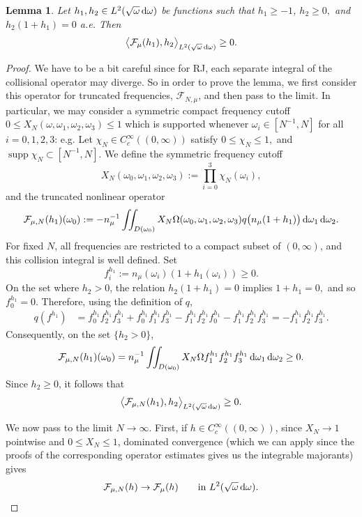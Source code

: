 \documentclass[reqno,11pt,letterpaper]{amsart}
\numberwithin{equation}{section}
\newcommand{\dd}{\, {\rm d}}
\newtheorem{lemma}[proposition]{Lemma}
\begin{document}
\begin{lemma}
\label{lemm:positiv_F_mu}
Let $h_1,h_2 \in L^2(\sqrt{\omega}\dd\omega)$ be functions such that
$
h_1\geq-1$, $ h_2\geq0,$ and $ h_2(1+h_1)=0$ a.e. Then
$$
\big\langle
\mathcal{F}_\mu(h_1),h_2
\big\rangle_{L^2(\sqrt{\omega}\dd\omega)}
\geq 0.
$$
\end{lemma}
\begin{proof}
We have to be a bit careful since for RJ, each separate integral of the collisional operator may diverge. So in order to prove the lemma, we first consider this operator for truncated frequencies, $\mathcal{F}_{N,\mu}$, and then pass to the limit. In particular, we may consider a symmetric compact frequency cutoff $0 \leq X_N(\omega, \omega_1, \omega_2, \omega_3)\leq 1$ which is supported whenever $\omega_i\in [N^{-1}, N]$ for all $i=0,1,2,3$: e.g.
Let $\chi_N\in C_c^\infty((0,\infty))$ satisfy
$ 0 \leq\chi_N \leq 1,$
and $ \operatorname{supp}\chi_N \subset[N^{-1},N].$ 
We define the symmetric frequency cutoff
$$
X_N(\omega_0,\omega_1,\omega_2,\omega_3)
:= \prod_{i=0}^3 \chi_N(\omega_i), $$
and the truncated nonlinear operator 
\begin{align*}
\mathcal{F}_{\mu,N}(h_1)(\omega_0)
:=-n_\mu^{-1} \iint_{D(\omega_0)}
X_N \Omega(\omega_0,\omega_1,\omega_2,\omega_3)
q \big( n_\mu(1+h_1) \big)
\dd\omega_1\dd\omega_2.
\end{align*}
For fixed $N$, all frequencies are restricted to a compact subset of
$(0,\infty)$, and this collision integral is well defined. 
Set
$$
f_i^{h_1}:=n_\mu(\omega_i) (1+h_1(\omega_i)) \geq 0.
$$
On the set where $h_2>0$, the relation $h_2(1+h_1)=0$ implies
$1+h_1=0,$ and so $ f_0^{h_1}=0$. 
Therefore, using the definition of $q$,
\begin{align*}
q(f^{h_1})
&=
f_0^{h_1} f_2^{h_1}f_3^{h_1} +
f_0^{h_1}f_1^{h_1}f_3^{h_1}-
f_1^{h_1}f_2^{h_1}f_0^{h_1}-
f_1^{h_1}f_2^{h_1}f_3^{h_1}
=-f_1^{h_1}f_2^{h_1}f_3^{h_1}.
\end{align*}
Consequently, on the set $\{h_2>0\}$,
$$
\mathcal F_{\mu,N}(h_1)(\omega_0)
= n_\mu^{-1} \iint_{D(\omega_0)}
X_N\Omega
f_1^{h_1}f_2^{h_1}f_3^{h_1}
\dd\omega_1\dd\omega_2 \geq 0.
$$
Since $h_2 \geq 0$, it follows that
\begin{equation}
\label{eq:truncated_quasi_positivity}
\big\langle
\mathcal{F}_{\mu,N}(h_1),h_2
\big\rangle_{L^2(\sqrt{\omega}\dd\omega)}
\geq 0.
\end{equation} 

We now pass to the limit $N\to\infty$. First, if $h\in C_c^\infty((0,\infty))$,  since $X_N \to 1$ pointwise and $0 \leq X_N\leq 1$, dominated convergence
(which we can apply since the proofs of the corresponding operator estimates gives us the integrable majorants) gives 
$$
\mathcal{F}_{\mu,N}(h) \to
\mathcal{F}_\mu(h)
\qquad\text{in }L^2(\sqrt{\omega}\dd\omega).
$$


\end{proof}
\end{document}
